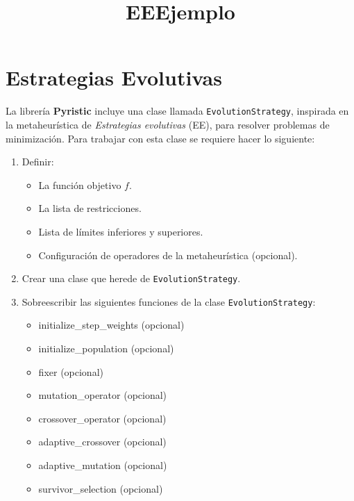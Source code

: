 \documentclass[11pt]{article}
\title{EEEjemplo}
\providecommand{\tightlist}{%
      \setlength{\itemsep}{0pt}\setlength{\parskip}{0pt}}
\begin{document}
    
    
    \maketitle
    
    

    
    \section{Estrategias Evolutivas}\label{estrategias-evolutivas}

La librería \textbf{Pyristic} incluye una clase llamada
\texttt{EvolutionStrategy}, inspirada en la metaheurística de
\emph{Estrategias evolutivas} (EE), para resolver problemas de
minimización. Para trabajar con esta clase se requiere hacer lo
siguiente:

\begin{enumerate}
\def\labelenumi{\arabic{enumi}.}
\item
  Definir:

  \begin{itemize}
  \tightlist
  \item
    La función objetivo \(f\).
  \item
    La lista de restricciones.
  \item
    Lista de límites inferiores y superiores.
  \item
    Configuración de operadores de la metaheurística (opcional).
  \end{itemize}
\item
  Crear una clase que herede de \texttt{EvolutionStrategy}.
\item
  Sobreescribir las siguientes funciones de la clase
  \texttt{EvolutionStrategy}:

  \begin{itemize}
  \tightlist
  \item
    initialize\_step\_weights (opcional)
  \item
    initialize\_population (opcional)
  \item
    fixer (opcional)
  \item
    mutation\_operator (opcional)
  \item
    crossover\_operator (opcional)
  \item
    adaptive\_crossover (opcional)
  \item
    adaptive\_mutation (opcional)
  \item
    survivor\_selection (opcional)
  \end{itemize}
\end{enumerate}
\end{document}
